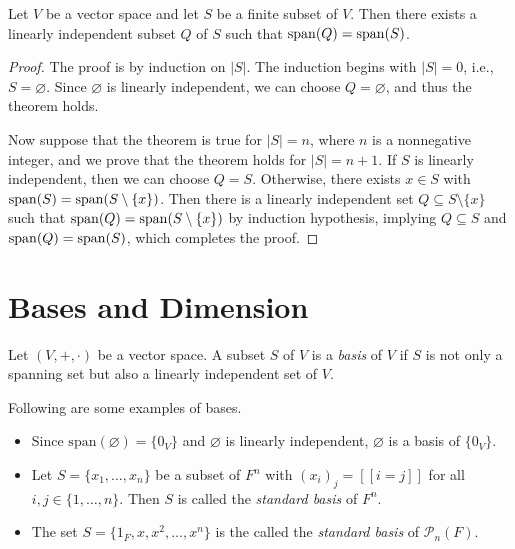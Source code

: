 \begin{theorem}\label{thm:linearly-independent-subset}
  Let $V$ be a vector space and let $S$ be a finite subset of $V$.
  Then there exists a linearly independent subset $Q$ of $S$ such that
  $\operatorname{span}(Q) = \operatorname{span}(S)$.
\end{theorem}
\begin{proof}
  The proof is by induction on $|S|$.
  The induction begins with $|S| = 0$, i.e., $S = \varnothing$.
  Since $\varnothing$ is linearly independent, we can choose
  $Q = \varnothing$, and thus the theorem holds.

  Now suppose that the theorem is true for $|S| = n$, where $n$ is a
  nonnegative integer, and we prove that the theorem holds for $|S| = n + 1$.
  If $S$ is linearly independent, then we can choose $Q = S$.
  Otherwise, there exists $x \in S$ with $\operatorname{span}(S) = \operatorname{span}(S \setminus \{x\})$.
  Then there is a linearly independent set $Q \subseteq S \setminus \{x\}$
  such that $\operatorname{span}(Q) = \operatorname{span}(S \setminus \{x\})$ by induction hypothesis,
  implying $Q \subseteq S$ and $\operatorname{span}(Q) = \operatorname{span}(S)$, which completes the proof.
\end{proof}

\section{Bases and Dimension}
\begin{definition}\label{def:basis}
  Let $(V, +, \cdot)$ be a vector space. A subset $S$ of $V$ is a \emph{basis}
  of $V$ if $S$ is not only a spanning set but also a linearly independent set
  of $V$.
\end{definition}

\begin{example}
  Following are some examples of bases.
  \begin{itemize}
    \item Since $\mathrm{span}(\varnothing) = \{0_V\}$ and $\varnothing$ is
      linearly independent, $\varnothing$ is a basis of $\{0_V\}$.
    \item Let $S = \{x_1, \dots, x_n\}$ be a subset of $F^n$ with
      $(x_i)_j = [\![i = j]\!]$ for all $i, j \in \{1, \dots, n\}$.
      Then $S$ is called the \emph{standard basis} of $F^n$.
    \item The set $S = \{1_F, x, x^2, \dots, x^n\}$ is the called the
      \emph{standard basis} of $\mathcal{P}_n(F)$.
  \end{itemize}
\end{example}

